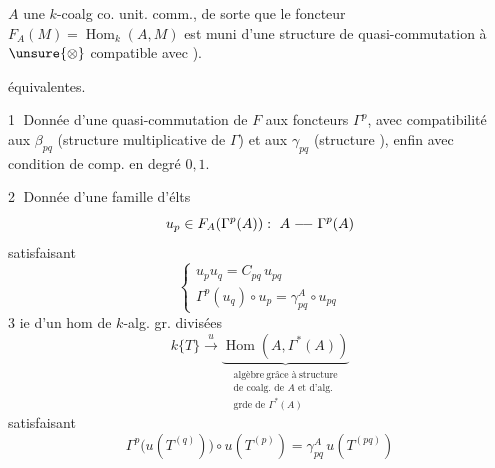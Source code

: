 


 $A$ une $k$-coalg co. unit. comm., de sorte que le foncteur $F_A(M)=\operatorname{Hom}_k(A,M)$
est muni d'une structure de quasi-commutation à $\unsure{\otimes}$ compatible avec ).

  équivalentes.

\textcircled{1} Donnée d'une quasi-commutation de $F$ aux foncteurs $\Gamma^p$, avec compatibilité aux $\beta_{pq}$ (structure multiplicative de $\Gamma$) et aux $\gamma_{pq}$ (structure ), enfin avec condition de comp. en degré $0,1$.

\textcircled{2} Donnée d'une famille d'élts
\[
u_p\in F_A(\Gamma^p(A)):\ A\mathrel{\relbar\joinrel\relbar}\Gamma^p(A)
\]
satisfaisant
\[
\begin{cases}
u_pu_q=C_{pq}\,u_{pq}\\
\Gamma^p(u_q)\circ u_p=\gamma^A_{pq}\circ u_{pq}
\end{cases}
\]
3 ie d'un hom  de $k$-alg. gr. divisées
\[
k\{T\}\xrightarrow{u}
\underbrace{\operatorname{Hom}(A,\Gamma^*(A))}_{\substack{\text{algèbre}\ \text{grâce à}\ \text{structure}\\
\text{de coalg. de }A\text{ et d'alg.}\\
\text{grde}\text{ de }\Gamma^*(A)}}
\]
satisfaisant
\[
\Gamma^p\bigl(u(T^{(q)})\bigr)\circ u(T^{(p)})
=\gamma^A_{pq}\,u(T^{(pq)})
\]

